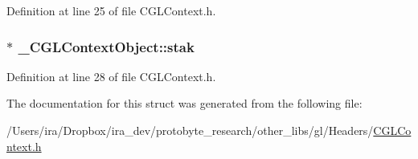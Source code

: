 Definition at line 25 of file C\-G\-L\-Context.\-h.

\hypertarget{struct___c_g_l_context_object_aa676a2022d2d5f49bdb5b4ef41a2cba8}{
\subsubsection[{stak}]{$\ast$ \-\_\-\-C\-G\-L\-Context\-Object\-::stak}}\label{struct___c_g_l_context_object_aa676a2022d2d5f49bdb5b4ef41a2cba8}


Definition at line 28 of file C\-G\-L\-Context.\-h.



The documentation for this struct was generated from the following file\-:\begin{DoxyCompactItemize}
\item 
/\-Users/ira/\-Dropbox/ira\-\_\-dev/protobyte\-\_\-research/other\-\_\-libs/gl/\-Headers/\hyperlink{_c_g_l_context_8h}{C\-G\-L\-Context.\-h}\end{DoxyCompactItemize}
